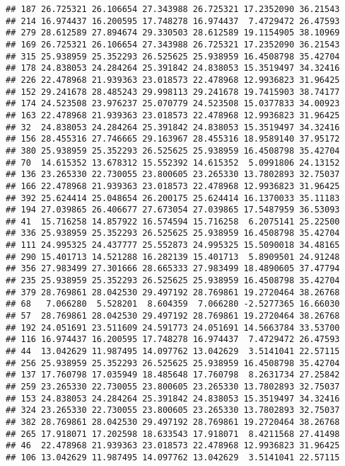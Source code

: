 \documentclass[
]{article}
\begin{document}
\begin{verbatim}
## 187 26.725321 26.106654 27.343988 26.725321 17.2352090 36.21543
## 214 16.974437 16.200595 17.748278 16.974437  7.4729472 26.47593
## 279 28.612589 27.894674 29.330503 28.612589 19.1154905 38.10969
## 169 26.725321 26.106654 27.343988 26.725321 17.2352090 36.21543
## 315 25.938959 25.352293 26.525625 25.938959 16.4508798 35.42704
## 178 24.838053 24.284264 25.391842 24.838053 15.3519497 34.32416
## 226 22.478968 21.939363 23.018573 22.478968 12.9936823 31.96425
## 152 29.241678 28.485243 29.998113 29.241678 19.7415903 38.74177
## 174 24.523508 23.976237 25.070779 24.523508 15.0377833 34.00923
## 163 22.478968 21.939363 23.018573 22.478968 12.9936823 31.96425
## 32  24.838053 24.284264 25.391842 24.838053 15.3519497 34.32416
## 156 28.455316 27.746665 29.163967 28.455316 18.9589140 37.95172
## 380 25.938959 25.352293 26.525625 25.938959 16.4508798 35.42704
## 70  14.615352 13.678312 15.552392 14.615352  5.0991806 24.13152
## 136 23.265330 22.730055 23.800605 23.265330 13.7802893 32.75037
## 166 22.478968 21.939363 23.018573 22.478968 12.9936823 31.96425
## 392 25.624414 25.048654 26.200175 25.624414 16.1370033 35.11183
## 194 27.039865 26.406677 27.673054 27.039865 17.5487959 36.53093
## 41  15.716258 14.857922 16.574594 15.716258  6.2075141 25.22500
## 336 25.938959 25.352293 26.525625 25.938959 16.4508798 35.42704
## 111 24.995325 24.437777 25.552873 24.995325 15.5090018 34.48165
## 290 15.401713 14.521288 16.282139 15.401713  5.8909501 24.91248
## 356 27.983499 27.301666 28.665333 27.983499 18.4890605 37.47794
## 235 25.938959 25.352293 26.525625 25.938959 16.4508798 35.42704
## 379 28.769861 28.042530 29.497192 28.769861 19.2720464 38.26768
## 68   7.066280  5.528201  8.604359  7.066280 -2.5277365 16.66030
## 57  28.769861 28.042530 29.497192 28.769861 19.2720464 38.26768
## 192 24.051691 23.511609 24.591773 24.051691 14.5663784 33.53700
## 116 16.974437 16.200595 17.748278 16.974437  7.4729472 26.47593
## 44  13.042629 11.987495 14.097762 13.042629  3.5141041 22.57115
## 256 25.938959 25.352293 26.525625 25.938959 16.4508798 35.42704
## 137 17.760798 17.035949 18.485648 17.760798  8.2631734 27.25842
## 259 23.265330 22.730055 23.800605 23.265330 13.7802893 32.75037
## 153 24.838053 24.284264 25.391842 24.838053 15.3519497 34.32416
## 324 23.265330 22.730055 23.800605 23.265330 13.7802893 32.75037
## 382 28.769861 28.042530 29.497192 28.769861 19.2720464 38.26768
## 265 17.918071 17.202598 18.633543 17.918071  8.4211568 27.41498
## 46  22.478968 21.939363 23.018573 22.478968 12.9936823 31.96425
## 106 13.042629 11.987495 14.097762 13.042629  3.5141041 22.57115

\end{verbatim}
\end{document}
